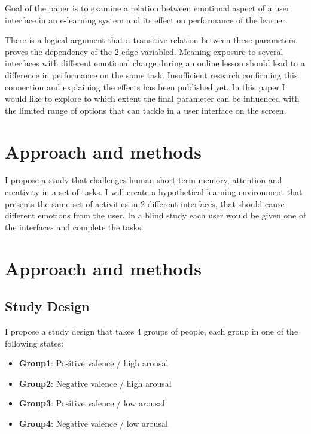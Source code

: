 Goal of the paper is to examine a relation between emotional aspect of a user interface in an e-learning system and its effect on performance of the learner.

There is a logical argument that a transitive relation between these parameters proves the dependency of the 2 edge variabled. 
Meaning exposure to several interfaces with different emotional charge during an online lesson should lead to a difference in performance on the same task.
Insufficient research confirming this connection and explaining the effects has been published yet. 
In this paper I would like to explore to which extent the final parameter can be influenced with the limited range of options that can tackle in a user interface on the screen.

\section{Approach and methods}

I propose a study that challenges human short-term memory, attention and creativity in a set of tasks. I will create a hypothetical learning environment that presents the same set of activities in 2 different interfaces, that should cause different emotions from the user. In a blind study each user would be given one of the interfaces and complete the tasks.

\pagebreak

\section{Approach and methods}

\subsection{Study Design}

I propose a study design that takes 4 groups of people, each group in one of the following states:

\begin{itemize}
	\item \textbf{Group1}: Positive valence / high arousal
	\item \textbf{Group2}: Negative valence / high arousal
	\item \textbf{Group3}: Positive valence / low arousal
	\item \textbf{Group4}: Negative valence / low arousal
\end{itemize}

